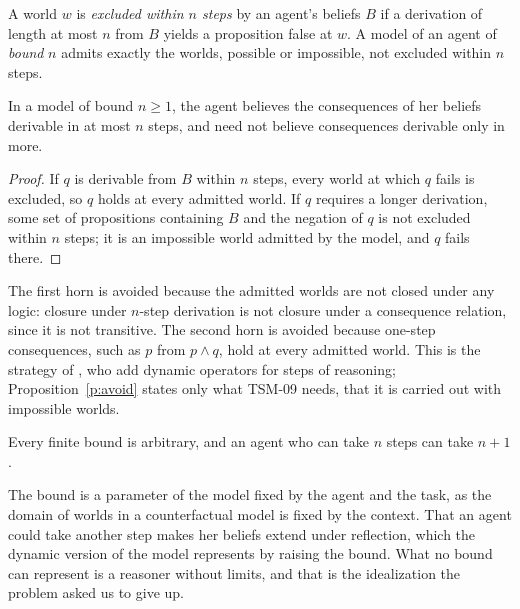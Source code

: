 \documentclass{situationist-preprint}
\begin{document}
\begin{definition}\label{d:bound}
A world $w$ is \emph{excluded within $n$ steps} by an agent's beliefs $B$ if a derivation of length at most $n$ from $B$ yields a proposition false at $w$. A model of an agent of \emph{bound} $n$ admits exactly the worlds, possible or impossible, not excluded within $n$ steps.
\end{definition}

\begin{proposition}\label{p:avoid}
In a model of bound $n \geq 1$, the agent believes the consequences of her beliefs derivable in at most $n$ steps, and need not believe consequences derivable only in more.
\end{proposition}

\begin{proof}
If $q$ is derivable from $B$ within $n$ steps, every world at which $q$ fails is excluded, so $q$ holds at every admitted world. If $q$ requires a longer derivation, some set of propositions containing $B$ and the negation of $q$ is not excluded within $n$ steps; it is an impossible world admitted by the model, and $q$ fails there.
\end{proof}

The first horn is avoided because the admitted worlds are not closed under any logic: closure under $n$-step derivation is not closure under a consequence relation, since it is not transitive. The second horn is avoided because one-step consequences, such as $p$ from $p \wedge q$, hold at every admitted world. This is the strategy of \citet{BjerringSkipper2019}, who add dynamic operators for steps of reasoning; Proposition~\ref{p:avoid} states only what TSM-09 needs, that it is carried out with impossible worlds.

\begin{objection}
Every finite bound is arbitrary, and an agent who can take $n$ steps can take $n + 1$.
\end{objection}

\begin{reply}
The bound is a parameter of the model fixed by the agent and the task, as the domain of worlds in a counterfactual model is fixed by the context. That an agent could take another step makes her beliefs extend under reflection, which the dynamic version of the model represents by raising the bound. What no bound can represent is a reasoner without limits, and that is the idealization the problem asked us to give up.
\end{reply}
\end{document}
